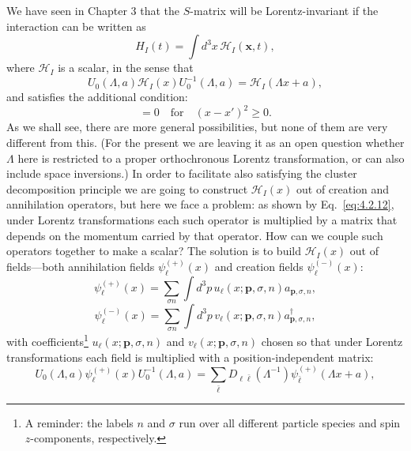 We have seen in Chapter 3 that the $S$-matrix will be Lorentz-invariant if
the interaction can be written as
\begin{equation}
  H_I(t)=\int d^3x\,\mathcal{H}_I(\mathbf{x},t),
  \tag{5.1.1}\label{eq:5.1.1}
\end{equation}
where $\mathcal{H}_I$ is a scalar, in the sense that
\begin{equation}
  U_0(\Lambda,a)\mathcal{H}_I(x)U_0^{-1}(\Lambda,a)
  =\mathcal{H}_I(\Lambda x+a),
  \tag{5.1.2}\label{eq:5.1.2}
\end{equation}
and satisfies the additional condition:
\begin{equation}
  [\mathcal{H}_I(x),\mathcal{H}_I(x')]=0
  \quad\text{for}\quad (x-x')^2\geq0.
  \tag{5.1.3}\label{eq:5.1.3}
\end{equation}
As we shall see, there are more general possibilities, but none of them
are very different from this. (For the present we are leaving it as an open
question whether $\Lambda$ here is restricted to a proper orthochronous Lorentz
transformation, or can also include space inversions.) In order to facilitate
also satisfying the cluster decomposition principle we are going to construct
$\mathcal{H}_I(x)$ out of creation and annihilation operators, but here we face
a problem: as shown by Eq.~\eqref{eq:4.2.12}, under Lorentz transformations each
such operator is multiplied by a matrix that depends on the momentum
carried by that operator. How can we couple such operators together
to make a scalar? The solution is to build $\mathcal{H}_I(x)$ out of fields---both
annihilation fields $\psi^{(+)}_\ell(x)$ and creation fields $\psi^{(-)}_\ell(x)$:
\begin{equation}
  \psi^{(+)}_\ell(x)=\sum_{\sigma n}\int d^3p\,
  u_\ell(x;\mathbf{p},\sigma,n)a_{\mathbf{p},\sigma,n},
  \tag{5.1.4}\label{eq:5.1.4}
\end{equation}
\begin{equation}
  \psi^{(-)}_\ell(x)=\sum_{\sigma n}\int d^3p\,
  v_\ell(x;\mathbf{p},\sigma,n)a^\dagger_{\mathbf{p},\sigma,n},
  \tag{5.1.5}\label{eq:5.1.5}
\end{equation}
with coefficients\footnote{A reminder: the labels $n$ and $\sigma$ run over all
different particle species and spin $z$-components, respectively.}
$u_\ell(x;\mathbf{p},\sigma,n)$ and $v_\ell(x;\mathbf{p},\sigma,n)$ chosen so that
under Lorentz transformations each field is multiplied with a
position-independent matrix:
\begin{equation}
  U_0(\Lambda,a)\psi^{(+)}_\ell(x)U_0^{-1}(\Lambda,a)
  =\sum_{\bar\ell}D_{\ell\bar\ell}(\Lambda^{-1})
  \psi^{(+)}_{\bar\ell}(\Lambda x+a),
  \tag{5.1.6}\label{eq:5.1.6}
\end{equation}
